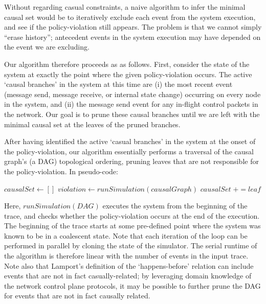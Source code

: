 Without regarding casual constraints, a naive algorithm to infer the minimal
causal set would be to iteratively
exclude each event from the system execution, and see if the policy-violation
still appears. The problem is that we cannot simply ``erase history'';
antecedent events in the system execution may have depended on the event we
are excluding.

Our algorithm therefore proceeds as as follows. First, consider
the state of the system at exactly the point where the given policy-violation
occurs. The active `causal branches' in the system at this time are (i) the
most recent event (message send, message receive, or internal state change)
occurring on every node in the system, and (ii) the message send event for any
in-flight control packets in the network. Our goal is to prune these causal
branches until we are left with the minimal causal set at the leaves of the
pruned branches.


After having identified the active `casual branches' in the system at the
onset of the policy-violation, our algorithm essentially performs a
traversal of the causal graph's (a DAG) topological ordering, pruning leaves that are not
responsible for the policy-violation. In pseudo-code:

\begin{algorithmic}
\State $causalSet \gets []$ 
    \State $violation \gets runSimulation(causalGraph)$
        \State $causalSet\;+= leaf$
    \EndIf
\EndWhile
\end{algorithmic}

Here, $runSimulation(DAG)$ executes the system from the beginning of the
trace, and checks whether the policy-violation occurs at the end of the
execution. The beginning of the trace starts at some pre-defined point where
the system was known to be in a coalescent state.
Note that each iteration of the loop can be performed in parallel by cloning 
the state of the simulator. The serial runtime of the algorithm is therefore
linear with the number of events in the input trace. Note also that Lamport's definition of the
`happens-before' relation can include events that are not in fact
casually-related; by leveraging domain knowledge of the network control plane
protocols, it may be possible to further prune the DAG for events that are not
in fact causally related.

